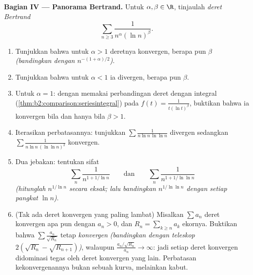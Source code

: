 \begin{problem}[{Soal akhir pekan --- $\zeta(2) = \pi^2/6$ dan
panorama Bertrand}]
\medskip
\noindent\textbf{Bagian IV --- Panorama Bertrand.} Untuk $\alpha,
\beta \in \R$, tinjaulah \emph{deret Bertrand}
\[
\sum_{n \geq 3} \frac{1}{n^{\alpha}(\ln n)^{\beta}} .
\]
\begin{enumerate}[resume]
  \item Tunjukkan bahwa untuk $\alpha > 1$ deretnya konvergen,
        berapa pun $\beta$ \emph{(bandingkan dengan
        $n^{-(1+\alpha)/2}$)}.
  \item Tunjukkan bahwa untuk $\alpha < 1$ ia divergen, berapa pun
        $\beta$.
  \item Untuk $\alpha = 1$: dengan memakai perbandingan deret dengan
        integral (\cref{thm:b2:comparison:seriesintegral}) pada $f(t) =
        \frac{1}{t(\ln t)^\beta}$, buktikan bahwa ia konvergen bila dan
        hanya bila $\beta > 1$.
  \item Iterasikan perbatasannya: tunjukkan $\sum\frac{1}{n\ln n\,\ln\ln
        n}$ divergen sedangkan $\sum\frac{1}{n\ln n\,(\ln\ln n)^2}$
        konvergen.
  \item Dua jebakan: tentukan sifat
        \[
        \sum_n \frac{1}{n^{1 + 1/\ln n}}
        \qquad\text{dan}\qquad
        \sum_n \frac{1}{n^{1 + 1/\ln\ln n}}
        \]
        \emph{(hitunglah $n^{1/\ln n}$ secara eksak; lalu bandingkan
        $n^{1/\ln\ln n}$ dengan setiap pangkat $\ln n$)}.
  \item (Tak ada deret konvergen yang paling lambat) Misalkan $\sum a_n$
        deret konvergen apa pun dengan $a_n > 0$, dan $R_n = \sum_{k
        \geq n}a_k$ ekornya. Buktikan bahwa $\sum
        \frac{a_n}{\sqrt{R_n}}$ tetap \emph{konvergen}
        \emph{(bandingkan dengan teleskop $2(\sqrt{R_n} -
        \sqrt{R_{n+1}})$)}, walaupun $\frac{a_n/\sqrt{R_n}}{a_n}
        \to \infty$: jadi setiap deret konvergen didominasi tegas
        oleh deret konvergen yang lain. Perbatasan
        kekonvergenannya bukan sebuah kurva, melainkan kabut.
\end{enumerate}


\end{problem}
